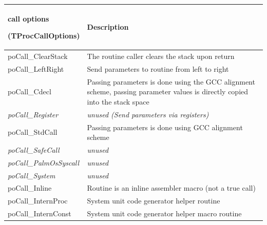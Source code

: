 \documentclass [a4paper,12pt]{article}
\begin{document}
\begin{longtable}{|l|p{10cm}|}
\hline
call options \par (TProcCallOptions) & Description \\
\hline
\endhead
\hline
\endfoot
\textsf{poCall{\_}ClearStack}&
	The routine caller clears the stack upon return \\
\textsf{poCall{\_}LeftRight}&
	Send parameters to routine from left to right \\
\textsf{poCall{\_}Cdecl}&
	Passing parameters is done using the GCC alignment scheme, passing
	parameter values is directly copied into the stack space \\
\textsf{\textit{poCall{\_}Register}}&
	\textit{unused (Send parameters via registers)} \\
\textsf{poCall{\_}StdCall}&
	Passing parameters is done using GCC alignment scheme \\
\textsf{\textit{poCall{\_}SafeCall}}&
	\textit{unused} \\
\textsf{\textit{poCall{\_}PalmOsSyscall}}&
	\textit{unused} \\
\textsf{\textit{poCall{\_}System}}&
	\textit{unused} \\
\textsf{poCall{\_}Inline}&
	Routine is an inline assembler macro (not a true call) \\
\textsf{poCall{\_}InternProc}&
	System unit code generator helper routine \\
\textsf{poCall{\_}InternConst}&
	System unit code generator helper macro routine \\
\end{longtable}
\end{document}
